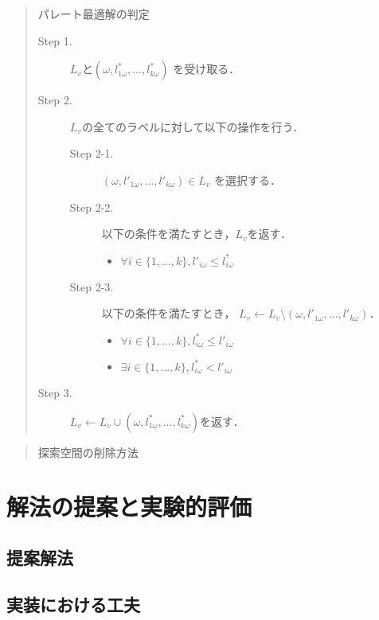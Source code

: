 \documentclass[12pt]{optlab-bachelor}
\begin{document}
\begin{quote}
  パレート最適解の判定
  \begin{description}
    \item[Step 1.] $L_v$と$(\omega,l^*_{1\omega},\ldots,l^*_{k\omega})$
    を受け取る．
    \item[Step 2.] $L_v$の全てのラベルに対して以下の操作を行う．
    \begin{description}
    \item[Step 2-1.] $(\omega,l'_{1\omega},\ldots,l'_{k\omega}) \in L_v$
    を選択する．
    \item[Step 2-2.] 以下の条件を満たすとき，$L_v$を返す．
    \begin{itemize}
      \item $\forall i \in \{1,\ldots,k\},l'_{i\omega} \le l^*_{i\omega}$
    \end{itemize}
    \item[Step 2-3.] 以下の条件を満たすとき，
    $L_v \leftarrow L_v \setminus (\omega,l'_{1\omega},\ldots,l'_{k\omega})$．
    \begin{itemize}
      \item $\forall i \in \{1,\ldots,k\},l^*_{i\omega} \le l'_{i\omega}$
      \item $\exists i \in \{1,\ldots,k\},l^*_{i\omega} < l'_{i\omega}$
    \end{itemize}
    \end{description}
    \item[Step 3.] $L_v \leftarrow L_v \cup (\omega,l^*_{1\omega},\ldots,l^*_{k\omega})$を返す．
  \end{description}
\end{quote}

\begin{quote}
  探索空間の削除方法
  \begin{description}
    
  \end{description}
\end{quote}


\chapter{解法の提案と実験的評価}

\section{提案解法}

\section{実装における工夫}
\end{document}
